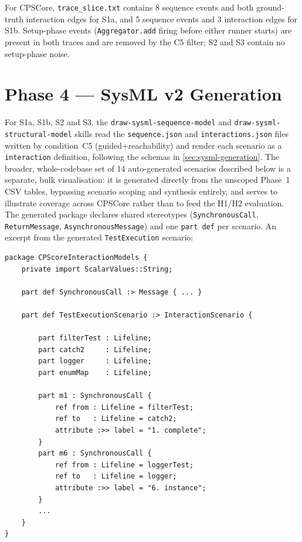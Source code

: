 For CPSCore, \texttt{trace\_slice.txt} contains 8 sequence events and
both ground-truth interaction edges for S1a, and 5 sequence events and
3 interaction edges for S1b. Setup-phase events
(\texttt{Aggregator.add} firing before either runner starts) are
present in both traces and are removed by the C5 filter; S2 and S3
contain no setup-phase noise.

\section{Phase 4 --- SysML v2 Generation}\label{sec:sysml-impl}

For S1a, S1b, S2 and S3, the \texttt{draw-sysml-sequence-model} and
\texttt{draw-sysml-structural-model} skills read the \texttt{sequence.json}
and \texttt{interactions.json} files written by condition~C5
(guided+reachability)
and render each scenario as a \sysml \texttt{interaction} definition,
following the schemas in \cref{sec:sysml-generation}. The broader,
whole-codebase set of 14 auto-generated scenarios described below is a
separate, bulk visualisation: it is generated directly from the unscoped
Phase~1 CSV tables, bypassing scenario scoping and synthesis entirely,
and serves to illustrate coverage across CPSCore rather than to feed the
H1/H2 evaluation. The generated package declares shared stereotypes
(\texttt{SynchronousCall}, \texttt{ReturnMessage},
\texttt{AsynchronousMessage}) and one \texttt{part def} per scenario. An
excerpt from the generated \texttt{TestExecution} scenario:

\begin{verbatim}
package CPScoreInteractionModels {
    private import ScalarValues::String;

    part def SynchronousCall :> Message { ... }

    part def TestExecutionScenario :> InteractionScenario {

        part filterTest : Lifeline;
        part catch2     : Lifeline;
        part logger     : Lifeline;
        part enumMap    : Lifeline;

        part m1 : SynchronousCall {
            ref from : Lifeline = filterTest;
            ref to   : Lifeline = catch2;
            attribute :>> label = "1. complete";
        }
        part m6 : SynchronousCall {
            ref from : Lifeline = loggerTest;
            ref to   : Lifeline = logger;
            attribute :>> label = "6. instance";
        }
        ...
    }
}
\end{verbatim}

